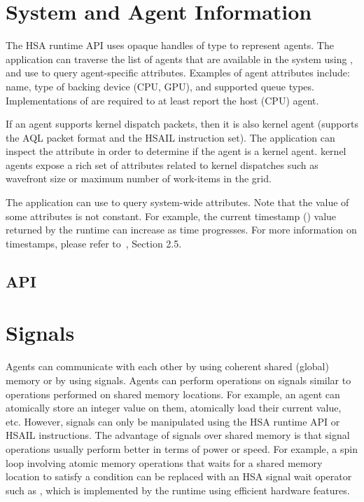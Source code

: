 \documentclass[final,oneside]{book}
\begin{document}
\section{System and Agent Information}
\label{sec:agentinfo}

The HSA runtime API uses opaque handles of type  to
represent agents. The application can traverse the list of agents that are
available in the system using , and use
 to query agent-specific attributes. Examples of
agent attributes include: name, type of backing device (CPU, GPU), and supported
queue types. Implementations of  are required to at
least report the host (CPU) agent.

If an agent supports kernel dispatch packets, then it is also kernel agent
(supports the AQL packet format and the HSAIL instruction set). The application
can inspect the  attribute in order to determine
if the agent is a kernel agent. kernel agents expose a rich set of
attributes related to kernel dispatches such as wavefront size or maximum number
of work-items in the grid.

The application can use  to query system-wide
attributes. Note that the value of some attributes is not constant. For example,
the current timestamp () value returned by the
runtime can increase as time progresses. For more information on timestamps,
please refer to~\cite{sar}, Section 2.5.

\subsection{API}


\section{Signals}\label{sec:signals}

Agents can communicate with each other by using coherent shared (global)
memory or by using signals. Agents can perform operations on signals similar
to operations performed on shared memory locations. For example, an agent
can atomically store an integer value on them, atomically load their current
value, etc. However, signals can only be manipulated using the HSA runtime API
or HSAIL instructions. The advantage of signals over shared memory is that
signal operations usually perform better in terms of power or speed. For
example, a spin loop involving atomic memory operations that waits for a shared
memory location to satisfy a condition can be replaced with an HSA signal wait
operator such as , which is implemented by the
runtime using efficient hardware features.
\end{document}
